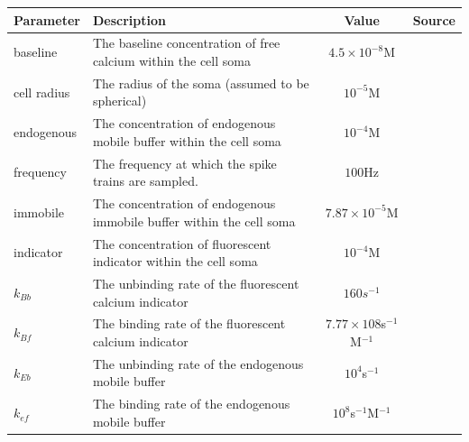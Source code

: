 \begin{table}
    \centering
    \begin{tabular}[t]{|l|p{6cm}|c|c|}
        \hline
        \textbf{Parameter}  & \textbf{Description}                                                                      & \textbf{Value}                        & \textbf{Source} \\ \hline
        baseline            & The baseline concentration of free calcium within the cell soma                           & $4.5 \times 10^{-8}$M                 &  \parencite{maravall} \\ \hline
        cell radius         & The radius of the soma (assumed to be spherical)                                          & $10^{-5}$M                            &  \parencite{fiala} \\ \hline
        endogenous         & The concentration of endogenous mobile buffer within the cell soma                       & $10^{-4}$M                            &  \parencite{faas} \\ \hline
        frequency           & The frequency at which the spike trains are sampled.                                      & $100$Hz                               & \\ \hline
        immobile            & The concentration of endogenous immobile buffer within the cell soma                     & $7.87 \times 10^{-5}$M                &  \parencite{bartol} \\ \hline
        indicator           & The concentration of fluorescent indicator within the cell soma                           & $10^{-4}$M                            &  \parencite{maravall} \\ \hline
        $k_{Bb}$            & The unbinding rate of the fluorescent calcium indicator                                   & $160s^{-1}$                           &  \parencite{bartol} \\ \hline
        $k_{Bf}$            & The binding rate of the fluorescent calcium indicator                                     & $7.77 \times 108$s$^{-1}$M$^{-1}$     &  \parencite{bartol} \\ \hline
        $k_{Eb}$            & The unbinding rate of the endogenous mobile buffer                                       & $10^4$s$^{-1}$                        &  \parencite{bartol} \\ \hline
        $k_{ef}$            & The binding rate of the endogenous mobile buffer                                         & $10^8$s$^{-1}$M$^{-1}$                &  \parencite{bartol} \\ \hline

\end{tabular}
\end{table}
